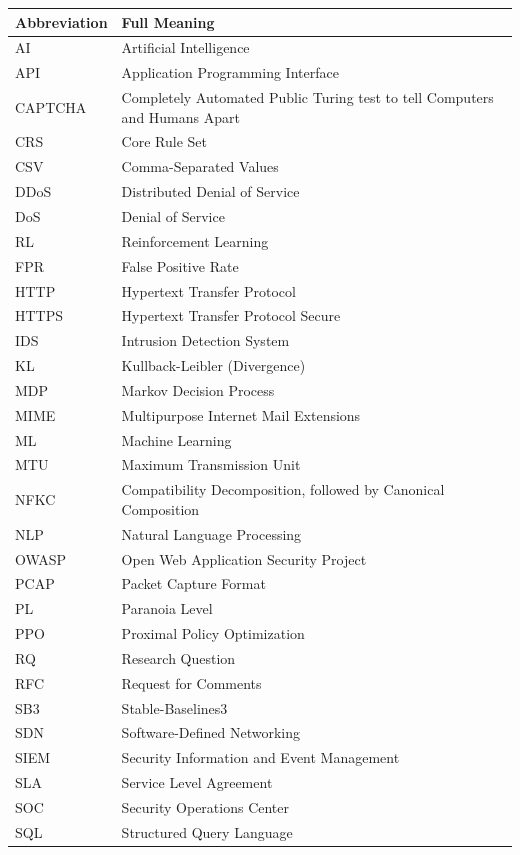 \documentclass[12pt,a4paper]{report}
\begin{document}
\begin{longtable}{L{3cm} L{11cm}}
\toprule
\textbf{Abbreviation} & \textbf{Full Meaning} \\
\midrule
\endhead
AI & Artificial Intelligence \\
API & Application Programming Interface \\
CAPTCHA & Completely Automated Public Turing test to tell Computers and Humans Apart \\
CRS & Core Rule Set \\
CSV & Comma-Separated Values \\
DDoS & Distributed Denial of Service \\
DoS & Denial of Service \\
RL & Reinforcement Learning \\
FPR & False Positive Rate \\
HTTP & Hypertext Transfer Protocol \\
HTTPS & Hypertext Transfer Protocol Secure \\
IDS & Intrusion Detection System \\
KL & Kullback-Leibler (Divergence) \\
MDP & Markov Decision Process \\
MIME & Multipurpose Internet Mail Extensions \\
ML & Machine Learning \\
MTU & Maximum Transmission Unit \\
NFKC & Compatibility Decomposition, followed by Canonical Composition \\
NLP & Natural Language Processing \\
OWASP & Open Web Application Security Project \\
PCAP & Packet Capture Format \\
PL & Paranoia Level \\
PPO & Proximal Policy Optimization \\
RQ & Research Question \\
RFC & Request for Comments \\
SB3 & Stable-Baselines3 \\
SDN & Software-Defined Networking \\
SIEM & Security Information and Event Management \\
SLA & Service Level Agreement \\
SOC & Security Operations Center \\
SQL & Structured Query Language \\

\end{longtable}
\end{document}
